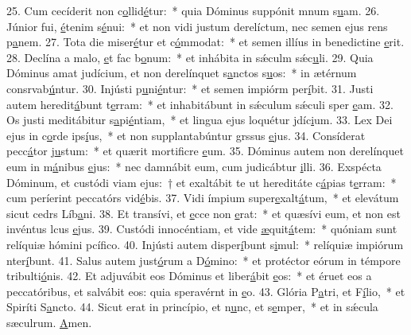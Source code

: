 25. Cum cecíderit non c\uline{o}llid\uline{é}tur:~* quia Dóminus suppónit mnum s\uline{u}am.
26. Júnior fui, \uline{é}tenim s\uline{é}nui:~* et non vidi justum derelíctum, nec semen ejus rens p\uline{a}nem.
27. Tota die miser\uline{é}tur et c\uline{ó}mmodat:~* et semen illíus in benedictine \uline{e}rit.
28. Declína a malo, \uline{e}t fac b\uline{o}num:~* et inhábita in sǽculm sǽc\uline{u}li.
29. Quia Dóminus amat judícium, et non derelínquet s\uline{a}nctos s\uline{u}os:~* in ætérnum consrvab\uline{ú}ntur.
30. Injústi p\uline{u}ni\uline{é}ntur:~* et semen impiórm per\uline{í}bit.
31. Justi autem heredit\uline{á}bunt t\uline{e}rram:~* et inhabitábunt in sǽculum sǽculi sper \uline{e}am.
32. Os justi meditábitur s\uline{a}pi\uline{é}ntiam,~* et lingua ejus loquétur jdíc\uline{i}um.
33. Lex Dei ejus in c\uline{o}rde ips\uline{í}us,~* et non supplantabúntur grssus \uline{e}jus.
34. Consíderat pecc\uline{á}tor j\uline{u}stum:~* et quærit mortificre \uline{e}um.
35. Dóminus autem non derelínquet eum in m\uline{á}nibus \uline{e}jus:~* nec damnábit eum, cum judicábtur \uline{i}lli.
36. Exspécta Dóminum, et custódi viam ejus:~† et exaltábit te ut hereditáte c\uline{á}pias t\uline{e}rram:~* cum períerint peccatórs vid\uline{é}bis.
37. Vidi ímpium super\uline{e}xalt\uline{á}tum,~* et elevátum sicut cedrs Líb\uline{a}ni.
38. Et transívi, et \uline{e}cce non \uline{e}rat:~* et quæsívi eum, et non est invéntus lcus \uline{e}jus.
39. Custódi innocéntiam, et vide \uline{æ}quit\uline{á}tem:~* quóniam sunt relíquiæ hómini pcíf\uline{i}co.
40. Injústi autem disper\uline{í}bunt s\uline{i}mul:~* relíquiæ impiórum nter\uline{í}bunt.
41. Salus autem just\uline{ó}rum a D\uline{ó}mino:~* et protéctor eórum in témpore tribulti\uline{ó}nis.
42. Et adjuvábit eos Dóminus et liber\uline{á}bit \uline{e}os:~* et éruet eos a peccatóribus, et salvábit eos: quia speravérnt in \uline{e}o.
43. Glória P\uline{a}tri, et F\uline{í}lio,~* et Spiríti S\uline{a}ncto.
44. Sicut erat in princípio, et n\uline{u}nc, et s\uline{e}mper,~* et in sǽcula sæculrum. \uline{A}men.
